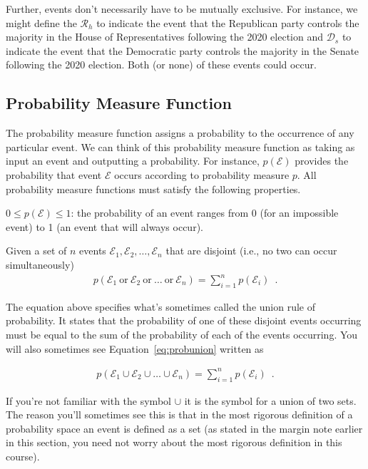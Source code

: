 \documentclass[assignment01_Solutions]{subfiles}
\begin{document}
Further, events don't necessarily have to be mutually exclusive.  For instance, we might define the $\mathcal{R}_h$ to indicate the event that the Republican party controls the majority in the House of Representatives following the 2020 election and $\mathcal{D}_s$ to indicate the event that the Democratic party controls the majority in the Senate following the 2020 election.  Both (or none) of these events could occur.

\subsection{Probability Measure Function}
The probability measure function assigns a probability to the occurrence of any particular event.  We can think of this probability measure function as taking as input an event and outputting a probability.  For instance, $p(\mathcal{E})$ provides the probability that event $\mathcal{E}$ occurs according to probability measure $p$.  All probability measure functions must satisfy the following properties.

\bi
\item $0 \leq p(\mathcal{E}) \leq 1$: the probability of an event ranges from 0 (for an impossible event) to 1 (an event that will always occur).
\item Given a set of $n$ events $\mathcal{E}_1, \mathcal{E}_2, \ldots, \mathcal{E}_n$ that are disjoint (i.e., no two can occur simultaneously)
\begin{align}
p(\mathcal{E}_1~\mbox{or}~\mathcal{E}_2~\mbox{or}~\ldots~\mbox{or}~\mathcal{E}_n) = \sum_{i=1}^n p(\mathcal{E}_i) \label{eq:probunion} \enspace .
\end{align}


The equation above specifies what's sometimes called the union rule of probability.  It states that the probability of one of these disjoint events occurring must be equal to the sum of the probability of each of the events occurring.  You will also sometimes see Equation~\ref{eq:probunion} written as

\begin{align}
p(\mathcal{E}_1 \cup \mathcal{E}_2 \cup \ldots \cup \mathcal{E}_n) = \sum_{i=1}^n p(\mathcal{E}_i) \enspace .
\end{align}

If you're not familiar with the symbol $\cup$ it is the symbol for a union of two sets.  The reason you'll sometimes see this is that in the most rigorous definition of a probability space an event is defined as a set (as stated in the margin note earlier in this section, you need not worry about the most rigorous definition in this course).
\end{document}
